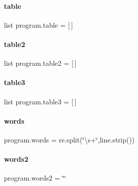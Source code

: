 \mbox{\label{namespaceprogram_a6ccdb054d60936fb1dc088f02507e1da}} 
\paragraph{table}
{\footnotesize\ttfamily list program.\+table = [$\,$]}

\mbox{\label{namespaceprogram_aeddcddb2b50f3bd08b9a1cfe2bc932ed}} 
\paragraph{table2}
{\footnotesize\ttfamily list program.\+table2 = [$\,$]}

\mbox{\label{namespaceprogram_a59b6740b6dbcde74fa2c7216ddac9520}} 
\paragraph{table3}
{\footnotesize\ttfamily list program.\+table3 = [$\,$]}

\mbox{\label{namespaceprogram_ae7ae5900685c39ab4a7b31b6768880a1}} 
\paragraph{words}
{\footnotesize\ttfamily program.\+words = re.\+split(\char`\"{}\textbackslash{}s+\char`\"{},line.\+strip())}

\mbox{\label{namespaceprogram_a9027654dd9ae29764677e06a8f983752}} 
\paragraph{words2}
{\footnotesize\ttfamily program.\+words2 = \char`\"{}\char`\"{}}

